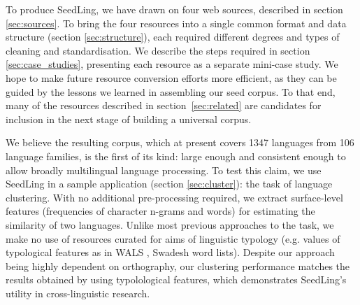 To produce SeedLing, we have drawn on four web sources, described in section \ref{sec:sources}. To bring the four resources into a single common format and data structure (section \ref{sec:structure}), each required different degrees and types of cleaning and standardisation. We describe the steps required in section \ref{sec:case_studies}, presenting each resource as a separate mini-case study. We hope to make future resource conversion efforts more efficient, as they can be guided by the lessons we learned in assembling our seed corpus. To that end, many of the resources described in section~\ref{sec:related} are candidates for inclusion in the next stage of building a universal corpus.

We believe the resulting corpus, which at present covers 1347 languages from 106 language families, is the first of its kind: large enough and consistent enough to allow broadly multilingual language processing. To test this claim, we use SeedLing in a sample application (section \ref{sec:cluster}): the task of language clustering. With no additional pre-processing required, we extract surface-level features (frequencies of character n-grams and words) for estimating the similarity of two languages. Unlike most previous approaches to the task, we make no use of resources curated for aims of linguistic typology (e.g. values of typological features as in WALS \cite{wals}, Swadesh word lists). Despite our approach being highly dependent on orthography, our clustering performance matches the results obtained by  using typolological features, which demonstrates SeedLing's utility in cross-linguistic research. 





